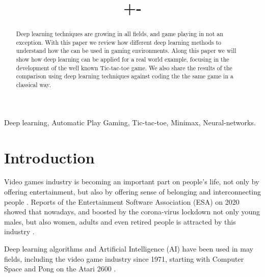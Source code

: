 \documentclass[conference]{IEEEtran}
\begin{document}
\title{+-\\
}

\author{
}

\maketitle

\begin{abstract}

Deep learning techniques are growing in all fields, and game playing in not an exception. With this paper we review how different deep learning methods to understand how the can be used in gaming environments. Along this paper we will show how deep learning can be applied for a real world example, focusing in the development of the well known Tic-tac-toe game. We also share the results of the comparison using deep learning techniques against coding the the same game in a classical way.


\end{abstract}

\begin{IEEEkeywords}
Deep learning, Automatic Play Gaming, Tic-tac-toe, Minimax, Neural-networks.
\end{IEEEkeywords}

\section{Introduction}\label{sec:intro}

Video games industry is becoming an important part on people's life, not only by offering entertainment, but also by offering sense of belonging and interconnecting people \cite{niche}. Reports of the Entertainment Software Association (ESA) on 2020 showed that nowadays, and boosted by the corona-virus lockdown  not only young males, but also women, adults and even retired people is attracted by this industry \cite{niche}.

Deep learning algorithms and Artificial Intelligence (AI) have been used in may fields, including the video game industry since 1971, starting with Computer Space and Pong on the Atari 2600 \cite{atari}.
\end{document}
